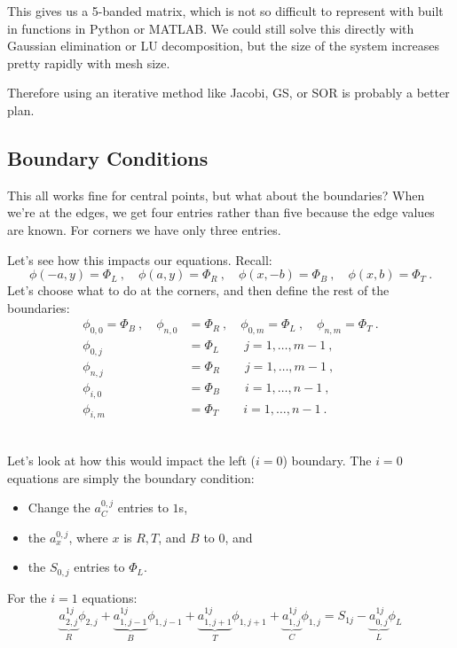 \documentclass[12pt, answers]{exam}
\begin{document}
This gives us a 5-banded matrix, which is not so difficult to represent with built in functions in Python or MATLAB. We could still solve this directly with Gaussian elimination or LU decomposition, but the size of the system increases pretty rapidly with mesh size.

Therefore using an iterative method like Jacobi, GS, or SOR is probably a better plan. 


\subsection*{Boundary Conditions}

This all works fine for central points, but what about the boundaries? When we're at the edges, we get four entries rather than five because the edge values are known. For corners we have only three entries. 

Let's see how this impacts our equations. Recall:
%
\[\phi(-a,y) = \Phi_L\:, \quad \phi(a,y) = \Phi_R\:, \quad \phi(x,-b) = \Phi_B\:, \quad \phi(x,b) = \Phi_T\:.\]
%
Let's choose what to do at the corners, and then define the rest of the boundaries:
%
\ifprintanswers
\begin{align}
\phi_{0,0} = \Phi_B\:, \quad \phi_{n,0} &= \Phi_R\:, \quad \phi_{0,m} = \Phi_L\:, \quad \phi_{n,m} = \Phi_T\:. \nonumber \\
\phi_{0,j} &= \Phi_L \qquad j=1,\dots,m-1 \:, \nonumber \\
\phi_{n,j} &= \Phi_R \qquad j=1,\dots,m-1 \:, \nonumber \\
\phi_{i,0} &= \Phi_B \qquad i=1,\dots,n-1 \:, \nonumber \\
\phi_{i,m} &= \Phi_T \qquad i=1,\dots,n-1 \:. \nonumber 
\end{align}
\else
\\ \vspace*{8em}
\fi

Let's look at how this would impact the left ($i=0$) boundary. The $i=0$ equations are simply the boundary condition:
\begin{itemize}
\item Change the $a_{C}^{0,j}$ entries to $1$s, 
\item the $a_{x}^{0,j}$, where $x$ is $R, T$, and $B$ to $0$, and 
\item the $S_{0,j}$ entries to $\Phi_L$.
\end{itemize} 

For the $i=1$ equations:
\[\underbrace{a_{2,j}^{1j}}_{R}\phi_{2,j} + \underbrace{a_{1,j-1}^{1j}}_{B}\phi_{1,j-1} + \underbrace{a_{1,j+1}^{1j}}_{T}\phi_{1,j+1} + \underbrace{a_{1,j}^{1j}}_{C}\phi_{1,j} = S_{1j} - \underbrace{a_{0,j}^{1j}}_{L}\phi_L \]
\end{document}
